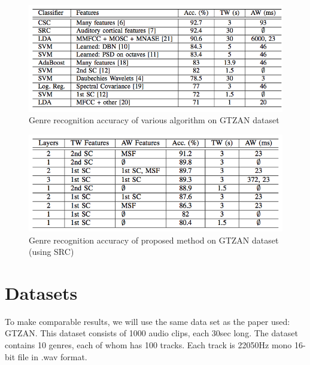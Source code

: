 \documentclass[final]{siamltexmm}
\begin{document}
\begin{figure}[ht]
\begin{center}
  \includegraphics[scale=0.8]{Figure5.png}
  \caption{Genre recognition accuracy of various algorithm on  GTZAN dataset}
  \label{fig5}
\end{center}
\end{figure}

\begin{figure}[ht]
\begin{center}
  \includegraphics[scale=0.8]{Figure6.png}
  \caption{Genre recognition accuracy of proposed method on  GTZAN dataset (using SRC)}
  \label{fig6}
\end{center}
\end{figure}

\section{Datasets}
To make comparable results, we will use the same data set as the paper used: GTZAN.  This dataset consists of 1000 audio clips, each 30sec long.  The dataset contains 10 genres, each of whom has 100 tracks.  Each track is 22050Hz mono 16-bit file in .wav format.
\end{document}
